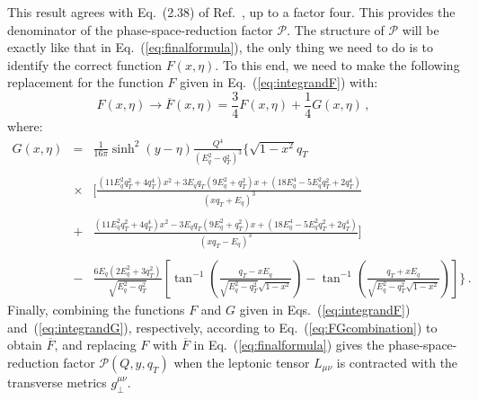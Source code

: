 \documentclass[10pt,a4paper]{article}
\begin{document}
This result agrees with Eq.~(2.38) of Ref.~\cite{Scimemi:2017etj}, up
to a factor four. This provides the denominator of the
phase-space-reduction factor $\mathcal{P}$. The structure of
$\mathcal{P}$ will be exactly like that in
Eq.~(\ref{eq:finalformula}), the only thing we need to do is to
identify the correct function $F(x,\eta)$. To this end, we need to
make the following replacement for the function $F$ given in
Eq.~(\ref{eq:integrandF}) with:
\begin{equation}\label{eq:FGcombination}
F(x,\eta)\rightarrow \overline{F}(x,\eta) = \frac34 F(x,\eta)+ \frac14 G(x,\eta)\,,
\end{equation}
where:
\begin{equation}\label{eq:integrandG}
\begin{array}{rcl}
\displaystyle G(x ,\eta)&=&\displaystyle 
                            \frac{1}{16\pi }\sinh^2(y-\eta)\frac{Q^4}{(E_q^2-q_T^2)^3}
                            \Bigg\{\sqrt{1-x^2}q_T\\
\\
&\times&\displaystyle\Bigg[\frac{(11E_q^2q_T^2+4q_T^4)x^2+
                       3 E_qq_T(9E_q^2+q_T^2)x + (18E_q^4-5E_q^2q_T^2+2q_T^4)}{(xq_T+
  E_q)^3}\\
\\
&+&\displaystyle\frac{(11E_q^2q_T^2+4q_T^4)x^2-
                       3 E_qq_T(9E_q^2+q_T^2)x + (18E_q^4-5E_q^2q_T^2+2q_T^4)}{(xq_T-
  E_q)^3}\Bigg]\\
\\
&-&\displaystyle\frac{6E_q (2E_q^2+3q_T^2)}{\sqrt{E_q^2-q_T^2}}\left[\tan^{-1}\left(\frac{q_T-
      xE_q}{\sqrt{E_q^2-q_T^2}\sqrt{1-x^2}}\right)-\tan^{-1}\left(\frac{q_T+
      xE_q}{\sqrt{E_q^2-q_T^2}\sqrt{1-x^2}}\right)\right]
\Bigg\}\,.
\end{array}
\end{equation}
Finally, combining the functions $F$ and $G$ given in
Eqs.~(\ref{eq:integrandF}) and~(\ref{eq:integrandG}), respectively,
according to Eq.~(\ref{eq:FGcombination}) to obtain $\overline{F}$,
and replacing $F$ with $\overline{F}$ in Eq.~(\ref{eq:finalformula})
gives the phase-space-reduction factor $\mathcal{P}(Q,y,q_T)$ when the
leptonic tensor $L_{\mu\nu}$ is contracted with the transverse metrics
$g_\perp^{\mu\nu}$.
\end{document}

